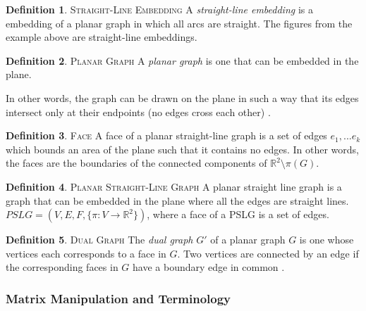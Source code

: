 \documentclass[11pt]{article}
\newcommand{\R}{\mathbb{R}}
\theoremstyle{definition}
\newtheorem{definition}{Definition}[section]
\begin{document}
	\theoremstyle{definition}
	\begin{definition}{\textsc{Straight-Line Embedding}}
		A \emph{straight-line embedding} is a embedding of a planar graph in which all arcs are straight. The figures from the example above are straight-line embeddings.
  	\end{definition}
	
	\theoremstyle{definition}
	\begin{definition}{\textsc{Planar Graph}}
		A \emph{planar graph} is one that can be embedded in the plane.
	\end{definition}
	
	In other words, the graph can be drawn on the plane in such a way that its edges intersect only at their endpoints (no edges cross each other) \cite{mathworld:PlanarGraph}.
	
	\theoremstyle{definition}
	\begin{definition}{\textsc{Face}}
		A face of a planar straight-line graph is a set of edges ${e_1,...e_k}$ which bounds an area of the plane such that it contains no edges.
		In other words, the faces are the boundaries of the connected components of $\R^2 \setminus \pi(G)$.
	\end{definition}
	
	\theoremstyle{definition}
	\begin{definition}{\textsc{Planar Straight-Line Graph}}
		A planar straight line graph is a graph that can be embedded in the plane where all the edges are straight lines. $PSLG = (V,E,F, \{\pi : V \rightarrow \R^2 \})$, where a face of a PSLG is a set of edges.
	\end{definition}
	
	\theoremstyle{definition}
	\begin{definition}{\textsc{Dual Graph}}
		The \emph{dual graph} $G'$ of a planar graph $G$ is one whose vertices each corresponds to a face in $G$. 
		Two vertices are connected by an edge if the corresponding faces in $G$ have a boundary edge in common \cite{mathworld:dualGraph}. 
  	\end{definition}

\subsubsection{Matrix Manipulation and Terminology}
\end{document}
